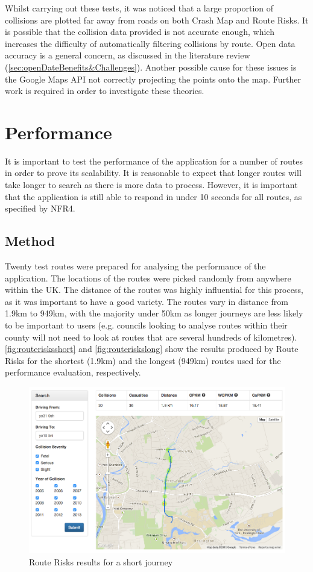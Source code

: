 \documentclass[authoryearcitations]{UoYCSproject}
\begin{document}
Whilst carrying out these tests, it was noticed that a large proportion of collisions are plotted far away from roads on both Crash Map and Route Risks. It is possible that the collision data provided is not accurate enough, which increases the difficulty of automatically filtering collisions by route. Open data accuracy is a general concern, as discussed in the literature review (\autoref{sec:openDateBenefits&Challenges}). Another possible cause for these issues is the Google Maps API not correctly projecting the points onto the map. Further work is required in order to investigate these theories.

\section{Performance}

It is important to test the performance of the application for a number of routes in order to prove its scalability. It is reasonable to expect that longer routes will take longer to search as there is more data to process. However, it is important that the application is still able to respond in under 10 seconds for all routes, as specified by NFR4. 

\subsection{Method}

Twenty test routes were prepared for analysing the performance of the application. The locations of the routes were picked randomly from anywhere within the UK. The distance of the routes was highly influential for this process, as it was important to have a good variety. The routes vary in distance from 1.9km to 949km, with the majority under 50km as longer journeys are less likely to be important to users (e.g. councils looking to analyse routes within their county will not need to look at routes that are several hundreds of kilometres). \autoref{fig:routerisksshort} and \autoref{fig:routeriskslong} show the results produced by Route Risks for the shortest (1.9km) and the longest (949km) routes used for the performance evaluation, respectively.


\begin{figure}
	\center
	\includegraphics[scale=0.45]{routerisksshortdist}
	\caption{Route Risks results for a short journey}
	\label{fig:routerisksshort}
\end{figure}
\end{document}
